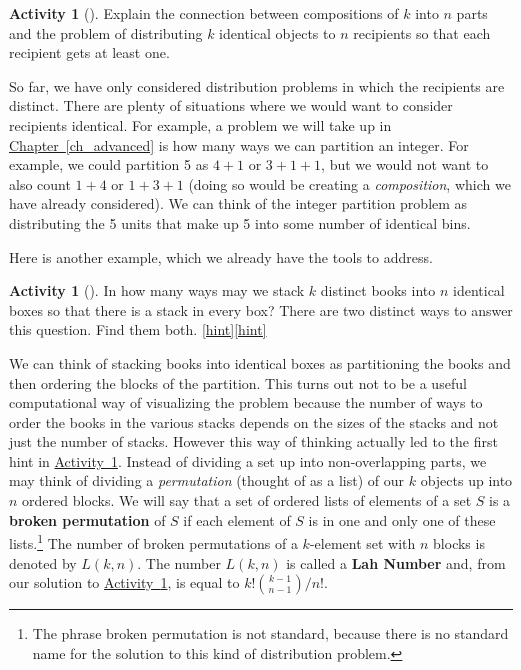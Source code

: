 \documentclass[10pt,]{book}
\newcommand{\terminology}[1]{\textbf{#1}}
\theoremstyle{plain}
\theoremstyle{definition}
\theoremstyle{definition}
\theoremstyle{definition}
\newtheorem{activity}[project]{Activity}
\numberwithin{equation}{chapter}
\begin{document}
\begin{activity}[]\label{activity-123}
\hypertarget{p-868}{}%
Explain the connection between compositions of \(k\) into \(n\) parts and the problem of distributing \(k\) identical objects to \(n\) recipients so that each recipient gets at least one.%
\end{activity}
\hypertarget{p-870}{}%
So far, we have only considered distribution problems in which the recipients are distinct.  There are plenty of situations where we would want to consider recipients identical.  For example, a problem we will take up in \hyperref[ch_advanced]{Chapter~\ref{ch_advanced}} is how many ways we can partition an integer.  For example, we could partition 5 as \(4+1\) or \(3+1+1\), but we would not want to also count \(1+4\) or \(1+3+1\) (doing so would be creating a \emph{composition}, which we have already considered).  We can think of the integer partition problem as distributing the 5 units that make up 5 into some number of identical bins.%
\par
\hypertarget{p-871}{}%
Here is another example, which we already have the tools to address.%
\begin{activity}[]\label{brokenpermutation}
\hypertarget{p-872}{}%
In how many ways may we stack \(k\) distinct books into \(n\) identical boxes so that there is a stack in every box? There are two distinct ways to answer this question.  Find them both.%
\hfill{\tiny\hyperlink{a-131}{[hint]}\hypertarget{q-131}{}}\hfill{\tiny\hyperlink{a-131}{[hint]}\hypertarget{q-131}{}}\end{activity}
\hypertarget{p-877}{}%
We can think of stacking books into identical boxes as partitioning the books and then ordering the blocks of the partition. This turns out not to be a useful computational way of visualizing the problem because the number of ways to order the books in the various stacks depends on the sizes of the stacks and not just the number of stacks. However this way of thinking actually led to the first hint in \hyperref[brokenpermutation]{Activity~\ref{brokenpermutation}}. Instead of dividing a set up into non-overlapping parts, we may think of dividing a \emph{permutation} (thought of as a list) of our \(k\) objects up into \(n\) ordered blocks. We will say that a set of ordered lists of elements of a set \(S\) is a \terminology{broken permutation}   of \(S\) if each element of \(S\) is in one and only one of these lists.\footnote{The phrase broken permutation is not standard, because there is no standard name for the solution to this kind  of distribution problem.\label{fn-11}} The number of broken permutations of a \(k\)-element set with \(n\) blocks is denoted by \(L(k,n)\). The number \(L(k,n)\) is called a \terminology{Lah Number} and, from our solution to \hyperref[brokenpermutation]{Activity~\ref{brokenpermutation}}, is equal to \(k!\binom{k-1}{n-1}/n!\).%
\end{document}
